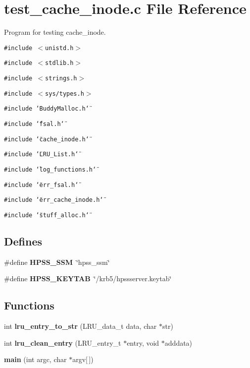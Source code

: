 \section{test\_\-cache\_\-inode.c File Reference}
\label{test__cache__inode_8c}
Program for testing cache\_\-inode.  


{\tt \#include $<$unistd.h$>$}\par
{\tt \#include $<$stdlib.h$>$}\par
{\tt \#include $<$strings.h$>$}\par
{\tt \#include $<$sys/types.h$>$}\par
{\tt \#include \char`\"{}BuddyMalloc.h\char`\"{}}\par
{\tt \#include \char`\"{}fsal.h\char`\"{}}\par
{\tt \#include \char`\"{}cache\_\-inode.h\char`\"{}}\par
{\tt \#include \char`\"{}LRU\_\-List.h\char`\"{}}\par
{\tt \#include \char`\"{}log\_\-functions.h\char`\"{}}\par
{\tt \#include \char`\"{}err\_\-fsal.h\char`\"{}}\par
{\tt \#include \char`\"{}err\_\-cache\_\-inode.h\char`\"{}}\par
{\tt \#include \char`\"{}stuff\_\-alloc.h\char`\"{}}\par
\subsection*{Defines}
\begin{CompactItemize}
\item 
\#define {\bf HPSS\_\-SSM}~\char`\"{}hpss\_\-ssm\char`\"{}
\item 
\#define {\bf HPSS\_\-KEYTAB}~\char`\"{}/krb5/hpssserver.keytab\char`\"{}
\end{CompactItemize}
\subsection*{Functions}
\begin{CompactItemize}
\item 
int {\bf lru\_\-entry\_\-to\_\-str} (LRU\_\-data\_\-t data, char $\ast$str)
\item 
int {\bf lru\_\-clean\_\-entry} (LRU\_\-entry\_\-t $\ast$entry, void $\ast$adddata)
\item 
{\bf main} (int argc, char $\ast$argv[$\,$])
\end{CompactItemize}


